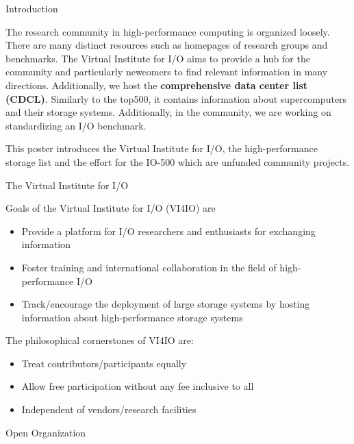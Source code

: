 \documentclass[portrait,a0paper,fontscale=0.4]{baposter}
\newcommand{\compresslist}{%
\setlength{\itemsep}{1pt}%
\setlength{\parskip}{0pt}%
\setlength{\parsep}{0pt}%
}
\begin{document}
\begin{poster}
\begin{posterbox}[name=problem,column=0]
{Introduction}

The research community in high-performance computing is organized loosely.
There are many distinct resources such as homepages of research groups and benchmarks.
The Virtual Institute for I/O aims to provide a hub for the community and particularly newcomers to find relevant information in many directions.
Additionally, we host the \textbf{comprehensive data center list (CDCL)}. Similarly to the top500, it contains information about supercomputers and their storage systems.
Additionally, in the community, we are working on standardizing an I/O benchmark.

This poster introduces the Virtual Institute for I/O, the high-performance storage list and the effort for the IO-500 which are unfunded community projects.
\end{posterbox}


\begin{posterbox}[name=approach,column=0,below=problem]
{The Virtual Institute for I/O}


Goals of the Virtual Institute for I/O (VI4IO) are
\vspace*{-1em}
\begin{itemize}\compresslist
\item Provide a platform for I/O researchers and enthusiasts for exchanging information
\item Foster training and international collaboration in the field of high-performance I/O
\item Track/encourage the deployment of large storage systems by hosting information about high-performance storage systems
\end{itemize}
\vspace*{-1em}

The philosophical cornerstones of VI4IO are:

\vspace*{-1em}
\begin{itemize}\compresslist
\item Treat contributors/participants equally
\item Allow free participation without any fee inclusive to all
\item Independent of vendors/research facilities
\end{itemize}
\end{posterbox}


\begin{posterbox}[name=overview,column=0,below=approach]{Open Organization}


\end{posterbox}
\end{poster}
\end{document}
